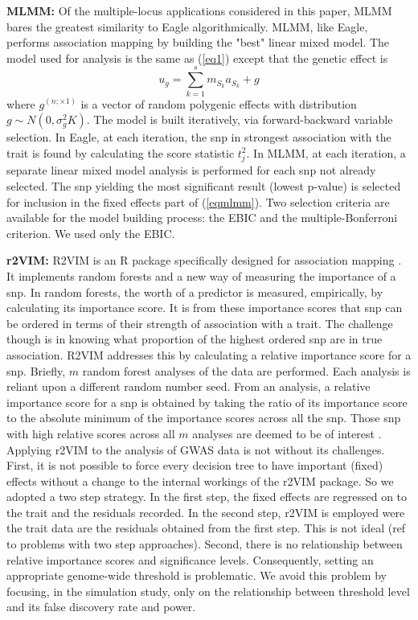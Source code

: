\documentclass{nature}
\begin{document}
\textbf{MLMM:} Of the multiple-locus applications considered in this paper, 
MLMM \cite{segura2012efficient} bares the greatest similarity to Eagle algorithmically.  MLMM, like Eagle, performs 
association mapping by building the "best" linear mixed model.  The model used for analysis 
is the same as (\ref{eq1}) except that the genetic effect is 
\begin{equation}
\label{eqmlmm}
u_g = \sum_{k=1}^s  m_{S_k} a_{S_k} + g
\end{equation}
where 
$g^{(n ; \times 1)}$ is a vector of random polygenic effects with distribution 
$g \sim N(0, \sigma^2_g K)$. The model is built iteratively, via forward-backward variable selection.  In Eagle, at each iteration, 
the snp in strongest association with the trait is found by calculating the score statistic $t_j^2$.  In MLMM, at each iteration, 
a separate linear mixed model analysis is performed for each snp not already selected. The snp yielding the most 
significant result (lowest p-value) is selected for inclusion in the fixed effects part of (\ref{eqmlmm}).  
Two selection 
criteria are available for the model building process: 
the EBIC and the multiple-Bonferroni criterion. We used only the EBIC. 



\textbf{r2VIM:} R2VIM is an R package specifically designed for association mapping \cite{szymczak2016r2vim}. 
It implements random forests and a new way of measuring the importance of a snp.  In random forests, the worth of a predictor is measured, empirically, by calculating its importance score. It is from these importance scores that snp can be ordered in terms of their strength of association with a trait. The challenge though is in knowing what proportion of the 
highest ordered snp are in true association. R2VIM addresses this by calculating a relative importance score for a snp. Briefly,
$m$ random forest analyses of the data are performed. Each analysis is reliant upon a different random number seed. 
From an analysis, a relative importance score for a snp is obtained by taking the ratio of its importance score to the absolute 
minimum of the importance scores across all the snp.  Those 
snp with high relative scores across all $m$ analyses are deemed to be of interest \cite{szymczak2016r2vim}.
Applying r2VIM to the analysis of GWAS data is not without its challenges.  First, it is not possible to force every 
decision tree to have important (fixed) effects without a change to the internal workings of the r2VIM package. 
So we adopted a two step 
strategy. In the first step, the fixed effects are regressed on to the trait and the residuals recorded.  In the second step, 
r2VIM is employed were the trait data are the residuals obtained from the first step. This is not ideal (ref to problems with two
step approaches).  Second, there is no relationship between relative importance scores and significance levels. Consequently, 
setting an appropriate genome-wide threshold is problematic. We avoid this problem by focusing, in the simulation study, 
only on the relationship between threshold level and its false discovery rate and power. 
\end{document}
